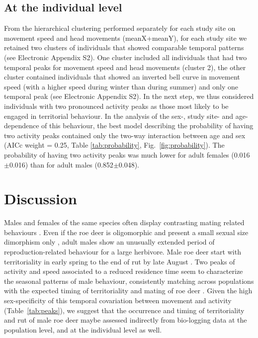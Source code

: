 \documentclass[a4paper,11pt]{article}
\newcommand{\nico}[1]{\todo[backgroundcolor=red!25,bordercolor=red]{\small #1}}
\begin{document}
\subsection*{At the individual level}
From the hierarchical clustering performed separately for each study
site on movement speed and head movements (meanX+meanY), for each
study site we retained two clusters of individuals that showed
comparable temporal patterns (see Electronic Appendix S2)\nico{To do  Vincent?}. One cluster
included all individuals that had two temporal peaks for movement
speed and head movements (cluster 2), the other cluster contained
individuals that showed an inverted bell curve in movement speed (with
a higher speed during winter than during summer) and only one temporal
peak (see Electronic Appendix S2). In the next step, we thus
considered individuals with two pronounced activity peaks as those
most likely to be engaged in territorial behaviour. In the analysis of
the sex-, study site- and age- dependence of this behaviour, the best
model describing the probability of having two activity peaks
contained only the two-way interaction between age and sex (AICc
weight = 0.25, Table \ref{tab:probability},
Fig.~\ref{fig:probability}). The probability of having two activity
peaks was much lower for adult females (0.016$\pm$0.016) than for
adult males (0.852$\pm$0.048).

\section*{Discussion}

Males and females of the same species often display contrasting mating
related behaviours \citep{clutton-brock_red_1982, lott_intraspecific_1984}. Even if the
roe deer is oligomorphic and present a small sexual size dimorphism
only \citep{andersen_social_1998}, adult males show an unusually extended period of
reproduction-related behaviour for a large herbivore. Male roe deer
start with territoriality in early spring to the end of rut by late
August \citep{bramley_1970}. Two peaks of activity and speed associated to a reduced residence time seem to characterize the seasonal patterns of male behaviour, consistently matching across populations with the expected timing of territoriality and mating of roe deer \citep{bramley_1970}. Given
the high sex-specificity of this temporal covariation between movement
and activity (Table~\ref{tab:peaks}), we suggest that the occurrence
and timing of territoriality and rut of male roe deer maybe assessed indirectly from bio-logging data at the population level, and at the individual level as well.
\end{document}
